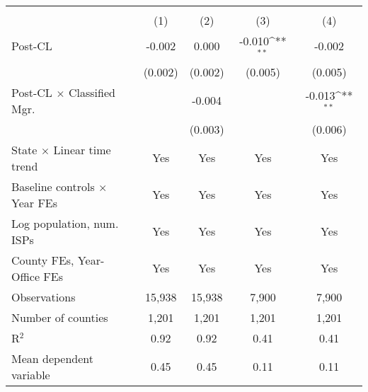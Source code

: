 {
\def\sym#1{\ifmmode^{#1}\else\(^{#1}\)\fi}
\begin{tabular}{l*{4}{c}}
\toprule
                    &&\\\cmidrule(lr){2-3}\cmidrule(lr){4-5}
                    &         &         &         &         \\
\midrule
Post-CL             &      -0.002         &       0.000         &      -0.010\sym{**} &      -0.002         \\
                    &     (0.002)         &     (0.002)         &     (0.005)         &     (0.005)         \\
\addlinespace
Post-CL $\times$ Classified Mgr.&                     &      -0.004         &                     &      -0.013\sym{**} \\
                    &                     &     (0.003)         &                     &     (0.006)         \\
\addlinespace
State $\times$ Linear time trend &         Yes         &         Yes         &         Yes         &         Yes         \\
\addlinespace
Baseline controls $\times$ Year FEs &         Yes         &         Yes         &         Yes         &         Yes         \\
\addlinespace
Log population, num. ISPs &         Yes         &         Yes         &         Yes         &         Yes         \\
\addlinespace
County FEs, Year-Office FEs &         Yes         &         Yes         &         Yes         &         Yes         \\
\midrule
Observations        &      15,938         &      15,938         &       7,900         &       7,900         \\
Number of counties  &       1,201         &       1,201         &       1,201         &       1,201         \\
R$^2$               &        0.92         &        0.92         &        0.41         &        0.41         \\
Mean dependent variable&        0.45         &        0.45         &        0.11         &        0.11         \\
\bottomrule
\end{tabular}
}
